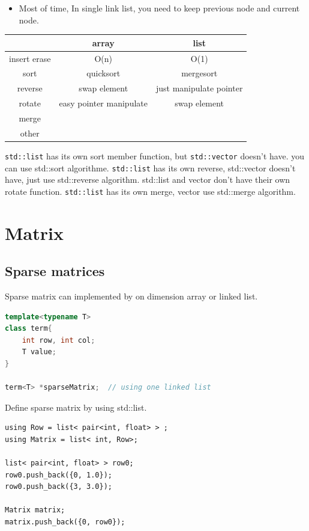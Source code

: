 \documentclass[a4paper,11pt,twoside]{book}
\begin{document}
\begin{itemize}
\begin{itemize}
\item Most of time, In single link list, you need to keep previous node and current node. 
\end{itemize}

\begin{tabular}{|c|c|c|}
\hline 
 & array & list \\ 
\hline 
insert erase & O(n) & O(1) \\ 
\hline 
sort & quicksort & mergesort  \\ 
\hline 
reverse & swap element & just manipulate pointer  \\ 
\hline 
rotate & easy pointer manipulate & swap element  \\ 
\hline 
merge &  &  \\ 
\hline 
other  &  &  \\ 
\hline 
\end{tabular} 


\par \texttt{std::list} has its own sort member function, but \texttt{std::vector} doesn't have. you can use std::sort algorithme. \texttt{std::list} has its own reverse,  std::vector doesn't have, just use std::reverse algorithm. std::list and vector don't have their own rotate function. \texttt{std::list} has its own merge, vector use std::merge algorithm.

\end{itemize}


\section{Matrix}
\subsection{Sparse matrices}

	\par Sparse matrix can implemented by on dimension array or linked list. 
\begin{lstlisting}[frame=single, language=c++]
template<typename T>
class term{
	int row, int col;
	T value;
}

term<T> *sparseMatrix;	// using one linked list
\end{lstlisting}

	\par Define sparse matrix by using std::list. 
\begin{lstlisting}
using Row = list< pair<int, float> > ;
using Matrix = list< int, Row>;

list< pair<int, float> > row0;
row0.push_back({0, 1.0});
row0.push_back({3, 3.0});

Matrix matrix;
matrix.push_back({0, row0});
\end{lstlisting}
\end{document}
